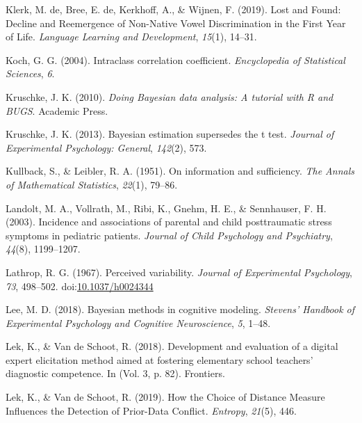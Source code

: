 \documentclass[openright,titlepage,12pt,a4paper]{book}
\begin{document}
\leavevmode\hypertarget{ref-de_klerk_lost_2019}{}%
Klerk, M. de, Bree, E. de, Kerkhoff, A., \& Wijnen, F. (2019). Lost and Found: Decline and Reemergence of Non-Native Vowel Discrimination in the First Year of Life. \emph{Language Learning and Development}, \emph{15}(1), 14--31.

\leavevmode\hypertarget{ref-koch_intraclass_2004}{}%
Koch, G. G. (2004). Intraclass correlation coefficient. \emph{Encyclopedia of Statistical Sciences}, \emph{6}.

\leavevmode\hypertarget{ref-kruschke_doing_2010}{}%
Kruschke, J. K. (2010). \emph{Doing Bayesian data analysis: A tutorial with R and BUGS}. Academic Press.

\leavevmode\hypertarget{ref-kruschke_bayesian_2013}{}%
Kruschke, J. K. (2013). Bayesian estimation supersedes the t test. \emph{Journal of Experimental Psychology: General}, \emph{142}(2), 573.

\leavevmode\hypertarget{ref-kullback_information_1951}{}%
Kullback, S., \& Leibler, R. A. (1951). On information and sufficiency. \emph{The Annals of Mathematical Statistics}, \emph{22}(1), 79--86.

\leavevmode\hypertarget{ref-landolt_incidence_2003}{}%
Landolt, M. A., Vollrath, M., Ribi, K., Gnehm, H. E., \& Sennhauser, F. H. (2003). Incidence and associations of parental and child posttraumatic stress symptoms in pediatric patients. \emph{Journal of Child Psychology and Psychiatry}, \emph{44}(8), 1199--1207.

\leavevmode\hypertarget{ref-lathrop_perceived_1967}{}%
Lathrop, R. G. (1967). Perceived variability. \emph{Journal of Experimental Psychology}, \emph{73}, 498--502. doi:\href{https://doi.org/10.1037/h0024344}{10.1037/h0024344}

\leavevmode\hypertarget{ref-lee_bayesian_2018}{}%
Lee, M. D. (2018). Bayesian methods in cognitive modeling. \emph{Stevens' Handbook of Experimental Psychology and Cognitive Neuroscience}, \emph{5}, 1--48.

\leavevmode\hypertarget{ref-lek_development_2018}{}%
Lek, K., \& Van de Schoot, R. (2018). Development and evaluation of a digital expert elicitation method aimed at fostering elementary school teachers' diagnostic competence. In (Vol. 3, p. 82). Frontiers.

\leavevmode\hypertarget{ref-lek_how_2019}{}%
Lek, K., \& Van de Schoot, R. (2019). How the Choice of Distance Measure Influences the Detection of Prior-Data Conflict. \emph{Entropy}, \emph{21}(5), 446.
\end{document}
